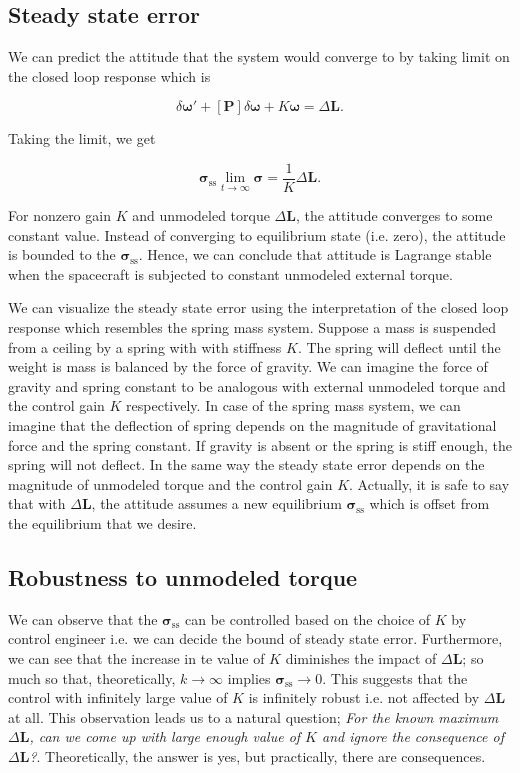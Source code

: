\documentclass{article}
\begin{document}
\subsection{Steady state error}

We can predict the attitude that the system would converge to by taking limit on the closed loop response which is

\begin{equation*}
  [\bm{I}]\delta\bm{\omega}'+[\bm{P}]\delta\bm{\omega}+K\bm{\omega}=\Delta\bm{L}.
\end{equation*}

Taking the limit, we get

\begin{equation*}
  \bm{\sigma}_{\text{ss}}\lim_{t\rightarrow\infty}\bm{\sigma}=\frac{1}{K}\Delta\bm{L}.
\end{equation*}

For nonzero gain $K$ and unmodeled torque $\Delta\bm{L}$, the attitude converges to some constant value. Instead of converging to equilibrium state (i.e. zero), the attitude is bounded to the $\bm{\sigma}_{\text{ss}}$. Hence, we can conclude that attitude is Lagrange stable when the spacecraft is subjected to constant unmodeled external torque. 

We can visualize the steady state error using the interpretation of the closed loop response which resembles the spring mass system. Suppose a mass is suspended from a ceiling by a spring with with stiffness $K$. The spring will deflect until the weight is mass is balanced by the force of gravity. We can imagine the force of gravity and spring constant to be analogous with external unmodeled torque and the control gain $K$ respectively. In case of the spring mass system, we can imagine that the deflection of spring depends on the magnitude of gravitational force and the spring constant. If gravity is absent or the spring is stiff enough, the spring will not deflect. In the same way the steady state error depends on the magnitude of unmodeled torque and the control gain $K$. Actually, it is safe to say that with $\Delta\bm{L}$, the attitude assumes a new equilibrium $\bm{\sigma}_{\text{ss}}$ which is offset from the equilibrium that we desire.

\subsection{Robustness to unmodeled torque}

We can observe that the $\bm{\sigma}_{\text{ss}}$ can be controlled based on the choice of $K$ by control engineer i.e. we can decide the bound of steady state error. Furthermore, we can see that the increase in te value of $K$ diminishes the impact of $\Delta\bm{L}$; so much so that, theoretically, $k\rightarrow\infty$ implies $\bm{\sigma}_{\text{ss}}\rightarrow0$. This suggests that the control with infinitely large value of $K$ is infinitely robust i.e. not affected by $\Delta\bm{L}$ at all. This observation leads us to a natural question; \textit{For the known maximum $\Delta\bm{L}$, can we come up with large enough value of $K$ and ignore the consequence of $\Delta\bm{L}$?}. Theoretically, the answer is yes, but practically, there are consequences.
\end{document}
